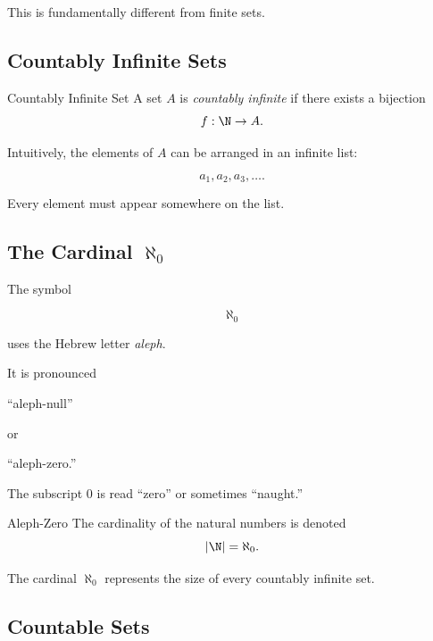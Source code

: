 This is fundamentally different from finite sets.

\subsection{Countably Infinite Sets}
\label{subsec:countably-infinite}

\begin{definitionbox}{Countably Infinite Set}
A set \(A\) is \emph{countably infinite} if there exists a bijection
\[ f:\N\to A. \]
\end{definitionbox}

Intuitively, the elements of \(A\) can be arranged in an infinite list:

\[ a_1,a_2,a_3,\ldots. \]

Every element must appear somewhere on the list.

\subsection{The Cardinal \(\aleph_0\)}
\label{subsec:aleph-zero}

The symbol

\[ \aleph_0 \]

uses the Hebrew letter \emph{aleph}.

It is pronounced

\begin{center}
``aleph-null''
\end{center}

or

\begin{center}
``aleph-zero.''
\end{center}

The subscript \(0\) is read ``zero'' or sometimes ``naught.''

\begin{definitionbox}{Aleph-Zero}
The cardinality of the natural numbers is denoted
\[ |\N|=\aleph_0. \]
\end{definitionbox}

The cardinal \(\aleph_0\) represents the size of every countably infinite set.

\subsection{Countable Sets}
\label{subsec:countable-sets}

